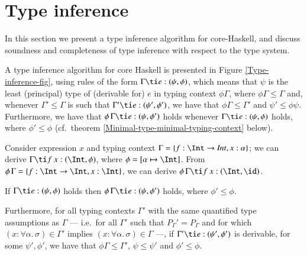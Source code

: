 \documentclass[review]{elsarticle}
\begin{document}
\section{Type inference}
\label{Type-inference}

In this section we present a type inference algorithm for
core-Haskell, and discuss soundness and completeness of type inference
with respect to the type system.

A type inference algorithm for core Haskell is presented in Figure
\ref{Type-inference-fig}, using rules of the form $\Gamma \ti
e:(\psi,\phi)$, which means that $\psi$ is the least (principal) type
of (derivable for) $e$ in typing context $\phi\Gamma$, where
$\phi\Gamma \leq \Gamma$ and, whenever $\Gamma' \leq \Gamma$ is such
that $\Gamma' \ti e: (\psi',\phi')$, we have that $\phi\Gamma \leq
\Gamma'$ and $\psi' \leq \phi\psi$. Furthermore, we have that
$\phi\,\Gamma \ti e:(\psi,\phi')$ holds whenever $\Gamma \ti
e:(\psi,\phi)$ holds, where $\phi'\leq \phi$ (cf.~theorem
\ref{Minimal-type-minimal-typing-context} below).

\begin{Example} {\rm
Consider expression $x$ and ty\-ping context $\Gamma = \{ f: \Int
\rightarrow {\it Int}, x:\alpha \}$; we can derive $\Gamma \ti f\: x:
(\Int, \phi)$, where $\phi = [\alpha \mapsto \Int]$. From
$\phi\,\Gamma = \{ f: \Int \rightarrow \Int, x:\Int \}$, we can derive
$\phi\,\Gamma \ti f\: x:(\Int,\id)$.}
\end{Example}

\begin{Theorem}

If $\Gamma \ti e:(\psi,\phi)$ holds then $\phi\,\Gamma \ti
e:(\psi,\phi')$ holds, where $\phi'\leq \phi$.

Furthermore, for all typing contexts $\Gamma'$ with the same
quantified type assumptions as $\Gamma$ --- i.e.~for all $\Gamma'$
such that $P_\Gamma' = P_\Gamma$ and for which $(x:\forall
\alpha.\,\sigma)\in \Gamma'$ implies $(x:\forall \alpha.\,\sigma)\in
\Gamma$ ---, if $\Gamma' \ti e:(\psi',\phi')$ is derivable, for some
$\psi', \phi'$, we have that $\phi\Gamma \leq \Gamma'$, $\psi \leq
\psi'$ and $\phi'\leq \phi$.

\label{Minimal-type-minimal-typing-context}
\end{Theorem}
\end{document}
